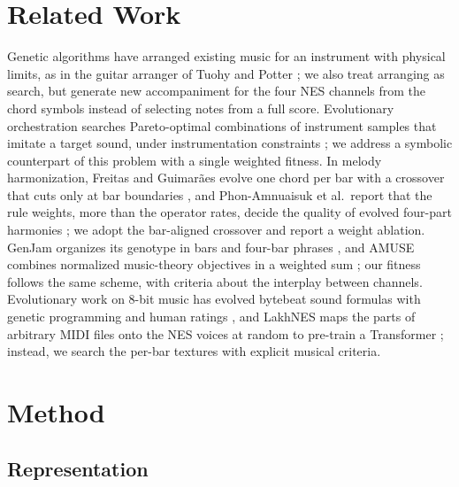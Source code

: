 \documentclass{article}
\begin{document}
\section{Related Work}\label{sec:related}

Genetic algorithms have arranged existing music for an instrument with physical limits, as in the
guitar arranger of Tuohy and Potter \cite{tuohy2006gabased}; we also treat arranging as search, but
generate new accompaniment for the four NES channels from the chord symbols instead of selecting
notes from a full score. Evolutionary orchestration searches Pareto-optimal combinations of instrument samples that imitate a target sound, under instrumentation constraints \cite{carpentier2010solving}; we address a symbolic counterpart of
this problem with a single weighted fitness. In melody harmonization, Freitas and
Guimar\~aes evolve one chord per bar with a crossover that cuts only at bar boundaries
\cite{freitas2011melody}, and Phon-Amnuaisuk et al.\ report that the rule weights, more than the
operator rates, decide the quality of evolved four-part harmonies \cite{phonamnuaisuk1999evolving};
we adopt the bar-aligned crossover and report a weight ablation. GenJam organizes its genotype in
bars and four-bar phrases \cite{biles1994genjam}, and AMUSE combines normalized music-theory
objectives in a weighted sum \cite{ozcan2008genetic}; our fitness follows the same scheme, with
criteria about the interplay between channels. Evolutionary work on 8-bit music has evolved bytebeat sound formulas with genetic programming and human ratings \cite{kaliakatsos2012interactive}, and LakhNES maps the parts of arbitrary MIDI files onto the NES voices at random to pre-train a Transformer \cite{donahue2019lakhnes}; instead, we search the per-bar textures with explicit musical criteria.

\section{Method}\label{sec:method}

\subsection{Representation}
\end{document}
